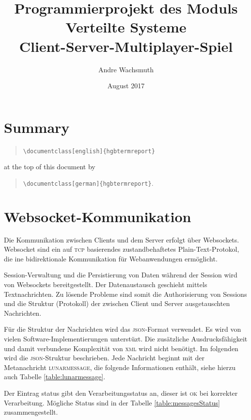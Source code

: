\documentclass[ngerman,11pt]{report}
\author{Andre Wachsmuth}
\title{Programmierprojekt des Moduls Verteilte Systeme \\ Client-Server-Multiplayer-Spiel}
\date{August 2017}
\begin{document}
\maketitle
\tableofcontents

\chapter*{Summary}

\begin{quote}
 \verb!\documentclass[english]{hgbtermreport}! 
\end{quote}
at the top of this document by
\begin{quote}
 \verb!\documentclass[german]{hgbtermreport}!.
\end{quote}


\chapter{Websocket-Kommunikation}

Die Kommunikation zwischen Clients und dem Server erfolgt über Websockets. Websocket
sind ein auf \textsc{tcp} basierendes zustandbehaftetes Plain-Text-Protokol, die 
ine bidirektionale Kommunikation für Webanwendungen ermöglicht.

Session-Verwaltung und die Persistierung von Daten während der Session wird von Websockets bereitgestellt.
Der Datenaustausch geschieht mittels Textnachrichten. Zu lösende Probleme sind somit die Authorisierung
von Sessions und die Struktur (Protokoll) der zwischen Client und Server ausgetauschten Nachrichten.

Für die Struktur der Nachrichten wird das \textsc{json}-Format verwendet. Es wird von vielen
Software-Implementierungen unterstüzt. Die zusätzliche Ausdrucksfähigkeit und damit verbundene
Komplexität von \textsc{xml} wird nicht benötigt. Im folgenden wird die \textsc{json}-Struktur
beschrieben. Jede Nachricht beginnt mit der Metanachricht \textsc{lunarmessage}, die folgende
Informationen enthält, siehe hierzu auch Tabelle \ref{table:lunarmessage}.

Der Eintrag status gibt den Verarbeitungsstatus an, dieser ist \textsc{ok} bei korrekter
Verarbeitung. Mögliche Status sind in der Tabelle \ref{table:messagesStatus} zusammengestellt.
\end{document}

